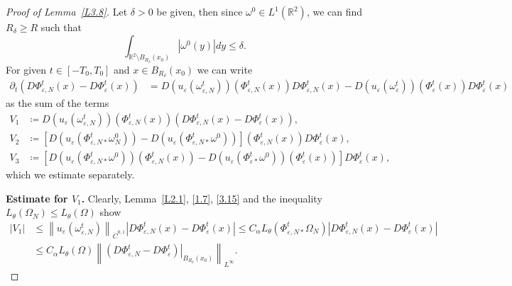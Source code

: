\documentclass[reqno,centertags,12pt]{amsart}
\theoremstyle{definition}
\numberwithin{equation}{section}
\newcommand{\abs}[1]{\left\lvert#1\right\rvert}
\newcommand{\norm}[1]{\left\|#1\right\|}
\newcommand{\bbR}{{\mathbb{R}}}
\newcommand{\eps}{\varepsilon}
\newcommand{\tht}{\theta}
\begin{document}
\begin{proof}[Proof of Lemma~\ref{L3.8}]
    Let $\delta>0$ be given, then since $\omega^{0}\in L^{1}(\bbR^{2})$,
    we can find $R_{\delta} \geq R$ such that
    \begin{equation}\label{3.16}
        \int_{\bbR^{2}\setminus B_{R_{\delta}}(x_{0})}\abs{\omega^{0}(y)}dy \leq \delta.
    \end{equation}
    For given $t\in[-T_{0},T_{0}]$ and $x\in B_{R_{\delta}}(x_{0})$ we can write
    \begin{align*}
        \partial_{t}\left(
            D\Phi_{\eps,N}^{t}(x) - D\Phi_{\eps}^{t}(x)
        \right)
        &= D(u_{\eps}(\omega_{\eps,N}^{t}))(\Phi_{\eps,N}^{t}(x))D\Phi_{\eps,N}^{t}(x)
        - D(u_{\eps}(\omega_{\eps}^{t}))(\Phi_{\eps}^{t}(x))D\Phi_{\eps}^{t}(x)
    \end{align*}
    as the sum of the terms
    \begin{align*}
        V_{1} &\coloneqq
        D(u_{\eps}(\omega_{\eps,N}^{t}))(\Phi_{\eps,N}^{t}(x))
        \left(D\Phi_{\eps,N}^{t}(x) - D\Phi_{\eps}^{t}(x)\right), \\
        V_{2} &\coloneqq \left[
            D(u_{\eps}(\Phi_{\eps,N*}^{t}\omega_{N}^{0}))
            - D(u_{\eps}(\Phi_{\eps,N*}^{t}\omega^{0}))
        \right](\Phi_{\eps,N}^{t}(x))D\Phi_{\eps}^{t}(x), \\
        V_{3} &\coloneqq \left[
            D(u_{\eps}(\Phi_{\eps,N*}^{t}\omega^{0}))(\Phi_{\eps,N}^{t}(x))
            - D(u_{\eps}(\Phi_{\eps*}^{t}\omega^{0}))(\Phi_{\eps}^{t}(x))
        \right]D\Phi_{\eps}^{t}(x),
    \end{align*}
    which we estimate separately.

    \textbf{Estimate for $V_{1}$.} Clearly, Lemma~\ref{L2.1}, \eqref{1.7},
    \eqref{3.15} and the inequality $L_{\tht}(\Omega_{N}) \leq L_{\tht}(\Omega)$ show
    \begin{align*}
        \abs{V_{1}} &\leq \norm{u_{\eps}(\omega_{\eps,N}^{t})}_{\dot{C}^{0,1}}
        \abs{D\Phi_{\eps,N}^{t}(x) - D\Phi_{\eps}^{t}(x)}
        \leq C_{\alpha}L_{\tht}(\Phi_{\eps,N*}^{t}\Omega_{N})
        \abs{D\Phi_{\eps,N}^{t}(x) - D\Phi_{\eps}^{t}(x)} \\
        &\leq C_{\alpha}L_{\tht}(\Omega)\norm{\left.\left(
            D\Phi_{\eps,N}^{t} - D\Phi_{\eps}^{t}
        \right)\right|_{B_{R_{\delta}}(x_{0})}}_{L^{\infty}}.
    \end{align*}


\end{proof}
\end{document}
